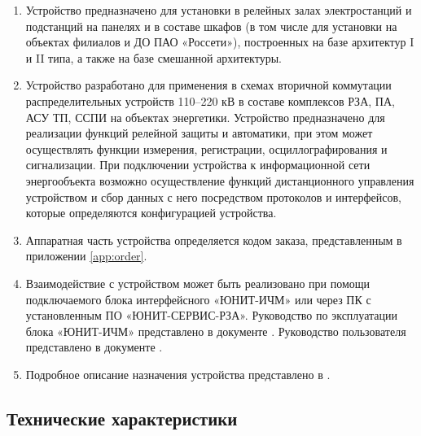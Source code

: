 \begin{enumerate}
\item Устройство предназначено для установки в релейных залах электростанций и подстанций на панелях и в составе шкафов (в том числе \cabinetlist для установки на объектах филиалов и ДО ПАО «Россети»), построенных на базе архитектур I и II типа, а также на базе смешанной архитектуры.
\item Устройство разработано для применения в схемах вторичной коммутации распределительных устройств 110–220 кВ в составе комплексов РЗА, ПА, АСУ ТП, ССПИ на объектах энергетики.
Устройство предназначено для реализации функций релейной защиты и автоматики, при этом может осуществлять функции измерения, регистрации, осциллографирования и сигнализации.
При подключении устройства к информационной сети энергообъекта возможно осуществление функций дистанционного управления устройством и сбор данных с него посредством протоколов и интерфейсов, которые определяются конфигурацией устройства.
\item Аппаратная часть устройства определяется кодом заказа, представленным в приложении \ref{app:order}.
\item Взаимодействие с устройством может быть реализовано при помощи подключаемого блока интерфейсного «ЮНИТ-ИЧМ» или через ПК с установленным ПО «ЮНИТ-СЕРВИС-РЗА». Руководство по эксплуатации блока «ЮНИТ-ИЧМ» представлено в документе \ManualUnitHMI. Руководство пользователя представлено в документе \ManualUnitSRZA.
\item Подробное описание назначения устройства представлено в \ManualUnitGeneral.
\end{enumerate}

{\color{unidarkgreen}\subsection{Технические характеристики}}

